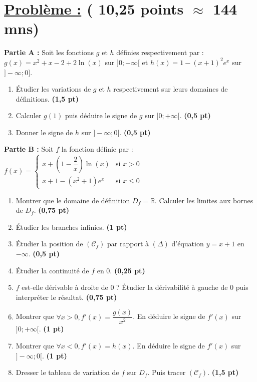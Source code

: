 \documentclass[12pt,a4paper]{article}
\begin{document}
\section*{\underline{Problème :} ( 10,25 points $\approx$ 144 mns)}

\textbf{Partie A : } Soit les fonctions $g$ et $h$ définies respectivement par : $g(x) = x^2 + x - 2 + 2\ln(x)$ sur $]0; +\infty[$ et $h(x) = 1 - (x+1)^2e^x$ sur $]-\infty; 0]$.

\begin{enumerate}
    \item Étudier les variations de $g$ et $h$ respectivement sur leurs domaines de définitions. \hfill \textbf{(1,5 pt)}
    \item Calculer $g(1)$ puis déduire le signe de $g$ sur $]0; +\infty[$. \hfill \textbf{(0,5 pt)}
    \item Donner le signe de $h$ sur $]-\infty; 0]$. \hfill \textbf{(0,5 pt)}
\end{enumerate}

\vspace{0.5cm}

\textbf{Partie B : } Soit $f$ la fonction définie par : 
$f(x) = 
\begin{cases} 
x + \left(1 - \dfrac{2}{x}\right) \ln(x) & \text{si } x > 0 \\
x + 1 - (x^2 + 1)e^x & \text{si } x \le 0 
\end{cases}$

\begin{enumerate}
    \item Montrer que le domaine de définition $D_f = \mathbb{R}$. Calculer les limites aux bornes de $D_f$. \hfill \textbf{(0,75 pt)}
    \item Étudier les branches infinies. \hfill \textbf{(1 pt)}
    \item Étudier la position de $(\mathcal{C}_f)$ par rapport à $(\Delta)$ d'équation $y = x + 1$ en $-\infty$. \hfill \textbf{(0,5 pt)}
    \item Étudier la continuité de $f$ en 0. \hfill \textbf{(0,25 pt)}
    \item $f$ est-elle dérivable à droite de 0 ? Étudier la dérivabilité à gauche de 0 puis interpréter le résultat. \hfill \textbf{(0,75 pt)}
    \item Montrer que $\forall x > 0, f'(x) = \dfrac{g(x)}{x^2}$. En déduire le signe de $f'(x)$ sur $]0; +\infty[$. \hfill \textbf{(1 pt)}
    \item Montrer que $\forall x < 0, f'(x) = h(x)$. En déduire le signe de $f'(x)$ sur $]-\infty; 0[$. \hfill \textbf{(1 pt)}
    \item Dresser le tableau de variation de $f$ sur $D_f$. Puis tracer $(\mathcal{C}_f)$. \hfill \textbf{(1,5 pt)}
\end{enumerate}
\end{document}
